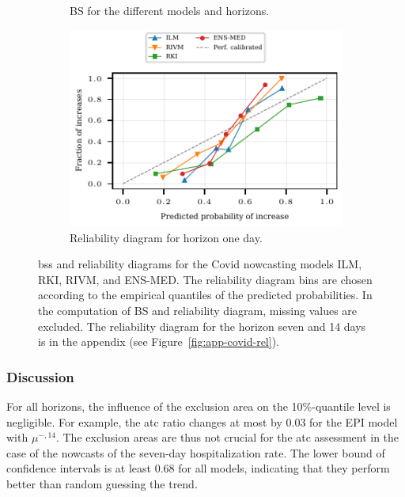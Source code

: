 \documentclass[pdflatex]{sn-jnl}
\theoremstyle{plain}%
\theoremstyle{definition}
\newcommand{\acc}{\mu}
\newcommand{\accml}[1][l]{\acc^{-,#1}}
\begin{document}
\begin{figure}
    \begin{subfigure}{0.48\textwidth}
        \centering
        \tiny
        
    \caption{BS for the different models and horizons.}\label{fig:app-covid-prob-brier}
    \end{subfigure}\hspace{0.01\textwidth}%
    \begin{subfigure}[t]{0.48\textwidth}
    \includegraphics{plots/covid_nowcast/60_reliability_diagram_lag_1}
    \caption{Reliability diagram for horizon one day.}\label{fig:app-covid-prob-rel-1}
    \end{subfigure}\hspace{0.01\textwidth}%
    \caption[Brier Scores and reliability diagrams for the Covid nowcasting models ILM, RKI, RIVM, and ENS-MED.]{\aclp{bs} and reliability diagrams for the Covid nowcasting models ILM, RKI, RIVM, and ENS-MED.
    The reliability diagram bins are chosen according to the empirical quantiles of the predicted probabilities.
    In the computation of BS and reliability diagram, missing values are excluded.
    The reliability diagram for the horizon seven and 14 days is in the appendix (see Figure~\ref{fig:app-covid-rel}).}
    \label{fig:app-covid-prob}
\end{figure}





\subsubsection*{Discussion}

For all horizons, the influence of the exclusion area on the 10\%-quantile level is negligible.
For example, the \ac{atc} ratio changes at most by 0.03 for the EPI model with $\accml[14]$.
The exclusion areas are thus not crucial for the \ac{atc} assessment in the case of the nowcasts of the seven-day hospitalization rate.
The lower bound of confidence intervals is at least 0.68 for all models, indicating that they perform better than random guessing the trend.
\end{document}
